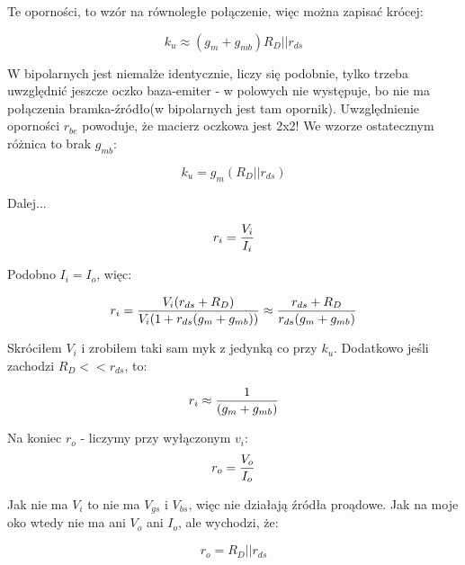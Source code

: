 \documentclass[10pt,a4paper]{article}
\begin{document}
Te oporności, to wzór na równoległe połączenie, więc można zapisać krócej:

\begin{equation}
k_u \approx {(g_m + g_{mb})R_D || r_{ds}}
\end{equation}

W bipolarnych jest niemalże identycznie, liczy się podobnie, tylko trzeba uwzględnić jeszcze oczko baza-emiter - w polowych nie występuje, bo nie ma połączenia bramka-źródło(w bipolarnych jest tam opornik). Uwzględnienie oporności $r_{be}$ powoduje, że macierz oczkowa jest 2x2! We wzorze ostatecznym różnica to brak $g_{mb}$:

\begin{equation}
k_u = {g_m(R_D || r_{ds})}
\end{equation}

Dalej...

\begin{equation}
r_i = {V_i \over I_i} 
\end{equation}

Podobno $I_i = I_o$, więc:

\begin{equation}
r_i = {V_i(r_{ds} + R_D) \over V_i(1+r_{ds}(g_m + g_{mb}))} \approx {r_{ds} + R_D \over r_{ds}(g_m + g_{mb})}
\end{equation}

Skróciłem $V_i$ i zrobiłem taki sam myk z jedynką co przy $k_u$. Dodatkowo jeśli zachodzi $R_D << r_{ds}$, to:

\begin{equation}
r_i \approx  {1 \over (g_m + g_{mb})}
\end{equation}

Na koniec $r_o$ - liczymy przy wyłączonym $v_i$:\\

\begin{equation}
r_o = {V_o \over I_o} 
\end{equation}

Jak nie ma $V_i$ to nie ma $V_{gs}$ i $V_{bs}$, więc nie działają źródła proądowe. Jak na moje oko wtedy nie ma ani $V_o$ ani $I_o$, ale wychodzi, że:

\begin{equation}
r_o = R_D || r_{ds}
\end{equation}
\end{document}
